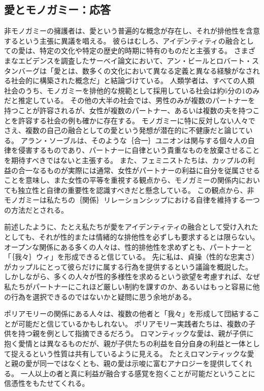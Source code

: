 \documentclass[paper=a4,book,openany]{jlreq}
\begin{document}
\subsection{愛とモノガミー：応答}

非モノガミーの擁護者は、愛という普遍的な概念が存在し、それが排他性を含意するという主張に異議を唱える。
彼らはむしろ、アイデンティティの融合としての愛は、特定の文化や特定の歴史的時期に特有のものだと主張する。
さまざまなエビデンスを調査したサーベイ論文において、アン・ビールとロバート・スタンバーグは「愛とは、数多くの文化において異なる定義と異なる経験がなされる社会的に構築された概念だ」と結論づけている\citep[p.433]{beall95:_social_const_love}。
人類学者は、すべての人類社会のうち、モノガミーを排他的な規範として採用している社会は約6分の1のみだと推定している。
その他の大半の社会では、男性のみが複数のパートナーを持つことが許容されるが、女性が複数のパートナー、あるいは複数の夫を持つことを許容する社会の例も確かに存在する。
モノガミーに特に反対しない人々でさえ、複数の自己の融合としての愛という発想が潜在的に不健康だと論じている。
アラン・ソーブルは、そのような｛合一｝{ユニオン}は関与する個々人の自律を侵害するものであり、パートナーに自律という貴重なものを放棄させることを期待すべきではないと主張する\citep{soble97:_union_auton_concer}。
また、フェミニストたちは、カップルの利益の合一なるものが実際には通常、女性がパートナーの利益に自分を従属させることを意味し、また女性の平等を重視する観点から、モノガミーの関係内においても独立性と自律の重要性を認識すべきだと懸念している\citep{friedman98:_roman_love_person_auton}。
この観点から、非モノガミーは私たちの｛関係｝{リレーションシップ}における自律を維持する一つの方法だとされる。

前述したように、たとえ私たちが愛をアイデンティティの融合として受け入れたとしても、それが性的または情緒的な排他性を必ずしも要求するとは限らない。
オープンな関係にある多くの人々は、性的排他性を求めずとも、パートナーと「｛我々｝{ウィ}」を形成できると信じている。
先に私は、貞操（性的な忠実さ）がカップルにとって彼らだけに属する行為を提供するという議論を概説した。
しかしながら、多くの人々が性的多様性を求めるという欲望を考慮すれば、なぜ私たちがパートナーにこれほど厳しい制約を課すのか、あるいはもっと容易に他の行為を選択できるのではないかと疑問に思う余地がある。

ポリアモリーの関係にある人々は、複数の他者と「我々」を形成して団結することが可能だと信じているかもしれない。
ポリアモリー実践者たちは、複数の子供を持つ親を例として指摘できるだろう。
ロマンティックな愛は、親が子供に抱く愛情とは異なるものだが、親が子供たちの利益を自分自身の利益と一体として捉えるという性質は共有しているように見える。
たとえロマンティックな愛と親の愛が同一ではなくとも、親の愛は示唆に富むアナロジーを提供してくれる。
一人以上の者と真に利益が融合する感覚を抱くことが可能だということに信憑性をもたせてくれる。
\end{document}
